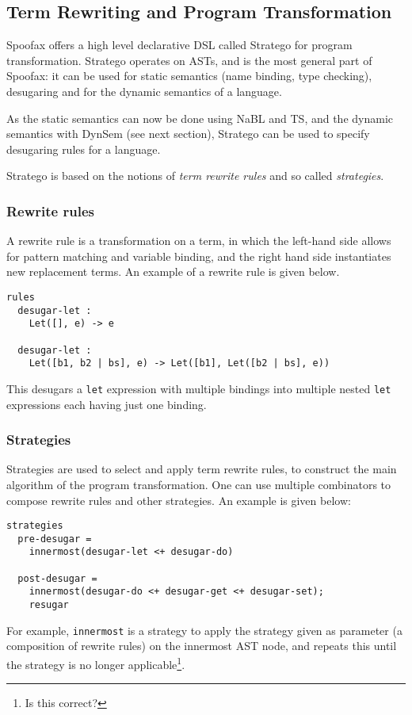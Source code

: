 \subsection{Term Rewriting and Program Transformation}
\label{sec-term-rewrite}
Spoofax offers a high level declarative DSL called Stratego for program
transformation. Stratego operates on ASTs, and is the most general
part of Spoofax: it can be used for static semantics (name binding,
type checking), desugaring and for the dynamic semantics of a
language.

As the static semantics can now be done using NaBL and TS, and the
dynamic semantics with DynSem (see next section), Stratego can be used
to specify desugaring rules for a language.

Stratego is based on the notions of \emph{term rewrite rules} and so called
\emph{strategies}.
\subsubsection{Rewrite rules}
\label{sec:orgheadline5}
A rewrite rule is a transformation on a term, in which
the left-hand side allows for pattern matching and variable binding,
and the right hand side instantiates new replacement terms. An example
of a rewrite rule is given below.
\begin{verbatim}
rules
  desugar-let :
  	Let([], e) -> e

  desugar-let :
  	Let([b1, b2 | bs], e) -> Let([b1], Let([b2 | bs], e))
\end{verbatim}
This desugars a \texttt{let} expression with multiple bindings into multiple
nested \texttt{let} expressions each having just one binding.
\subsubsection{Strategies}
\label{sec:orgheadline6}
Strategies are used to select and apply term rewrite rules, to
construct the main algorithm of the program transformation. One can
use multiple combinators to compose rewrite rules and other
strategies. An example is given below:
\begin{verbatim}
strategies
  pre-desugar =
    innermost(desugar-let <+ desugar-do)

  post-desugar =
    innermost(desugar-do <+ desugar-get <+ desugar-set);
    resugar
\end{verbatim}
For example, \texttt{innermost} is a strategy to apply the strategy given as
parameter (a composition of rewrite rules) on the innermost AST node,
and repeats this until the strategy is no longer applicable\footnote{Is
this correct?}.
